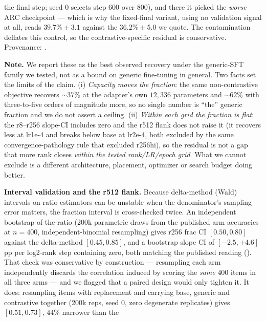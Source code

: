 \begin{table}[tbp]
\begin{threeparttable}
\begin{tablenotes}[flushleft]
the final step; seed 0 selects step 600 over 800), and there it picked the
\emph{worse} ARC checkpoint --- which is why the fixed-final variant, using no
validation signal at all, reads $39.7\% \pm 3.1$ against the $36.2\% \pm 5.0$ we
quote. The contamination deflates this control, so the contrastive-specific residual
is conservative. Provenance:
.
\item \textbf{Note.} We report these as the best observed recovery under the
generic-SFT family we tested, not as a bound on generic fine-tuning in general. Two
facts set the limits of the claim. (i) \emph{Capacity moves the fraction}: the same
non-contrastive objective recovers ${\sim}37\%$ at the adapter's own $12{,}336$
parameters and ${\sim}62\%$ with three-to-five orders of magnitude more, so no single
number is ``the'' generic fraction and we do not assert a ceiling. (ii) \emph{Within
each grid the fraction is flat}: the r8--r256 slope-CI includes zero and the r512
flank does not raise it (it recovers less at lr1e-4 and breaks below base at lr2e-4,
both excluded by the same convergence-pathology rule that excluded r256hi), so the
residual is not a gap that more rank closes \emph{within the tested rank/LR/epoch
grid}. What we cannot exclude is a different architecture, placement, optimizer or
search budget doing better.
\item \textbf{Interval validation and the r512 flank.} Because delta-method (Wald)
intervals on ratio estimators can be unstable when the denominator's sampling error
matters, the fraction interval is cross-checked twice. An independent
bootstrap-of-the-ratio (200k parametric draws from the published arm accuracies at
$n{=}400$, independent-binomial resampling) gives r256 frac CI
$[0.50, 0.80]$ against the delta-method $[0.45, 0.85]$, and a bootstrap slope CI of
$[-2.5, +4.6]$ pp per log2-rank step containing zero, both matching the published
reading (). That check was
conservative by construction --- resampling each arm independently discards the
correlation induced by scoring the \emph{same} $400$ items in all three arms --- and
we flagged that a paired design would only tighten it. It does: resampling items with
replacement and carrying base, generic and contrastive together (200k reps, seed $0$,
zero degenerate replicates) gives $\mathbf{[0.51, 0.73]}$, $44\%$ narrower than the

\end{tablenotes}
\end{threeparttable}
\end{table}
